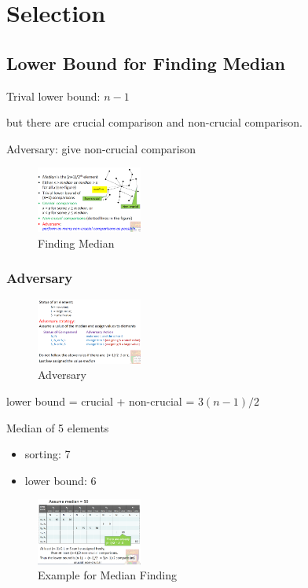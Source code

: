 \newpage
\section{Selection}
\subsection{Lower Bound for Finding Median}

Trival lower bound: $n-1$

but there are crucial comparison and non-crucial comparison.

Adversary: give non-crucial comparison

\begin{figure}[H]
    \centering
    \includegraphics[width=0.309\textwidth]{pic/DAA3/Finding Median}
    \caption{Finding Median}
\end{figure}

\subsubsection{Adversary}
\begin{figure}[H]
    \centering
    \includegraphics[width=0.309\textwidth]{pic/DAA3/Adversary}
    \caption{Adversary}
\end{figure}

lower bound = crucial + non-crucial = $3(n-1)/2$

\begin{example}
    Median of 5 elements
    \begin{itemize}
        \item sorting: 7
        \item lower bound: 6
    \end{itemize}

    \begin{figure}[H]
        \centering
        \includegraphics[width=0.309\textwidth]{pic/DAA3/Example for Median Finding}
        \caption{Example for Median Finding}
    \end{figure}
    
\end{example}

